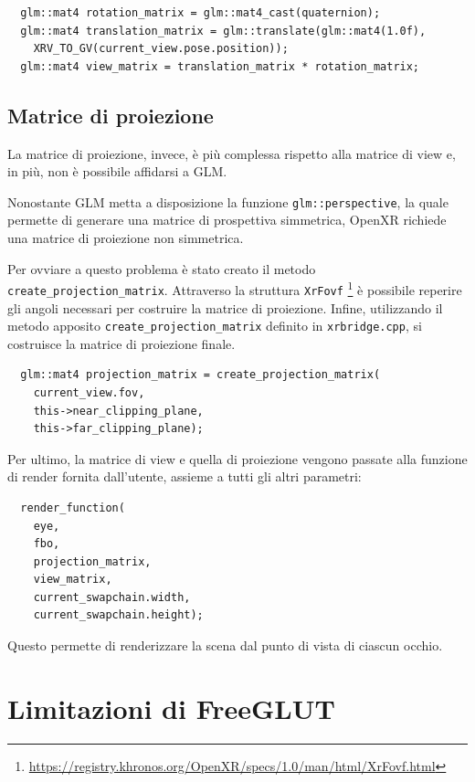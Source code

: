 \documentclass[twoside]{supsistudent}
\begin{document}
\begin{verbatim}
  glm::mat4 rotation_matrix = glm::mat4_cast(quaternion);
  glm::mat4 translation_matrix = glm::translate(glm::mat4(1.0f),
    XRV_TO_GV(current_view.pose.position));
  glm::mat4 view_matrix = translation_matrix * rotation_matrix;
\end{verbatim}

\subsection{Matrice di proiezione}

La matrice di proiezione, invece, è più complessa rispetto alla matrice di view e, in più, non è possibile affidarsi a GLM.

Nonostante GLM metta a disposizione la funzione \texttt{glm::perspective}, la quale permette di generare una matrice di prospettiva simmetrica, OpenXR richiede una matrice di proiezione non simmetrica.

Per ovviare a questo problema è stato creato il metodo \texttt{create\_projection\_matrix}. Attraverso la struttura \texttt{XrFovf} \footnote{\url{https://registry.khronos.org/OpenXR/specs/1.0/man/html/XrFovf.html}} è possibile reperire gli angoli necessari per costruire la matrice di proiezione. Infine, utilizzando il metodo apposito \texttt{create\_projection\_matrix} definito in \texttt{xrbridge.cpp}, si costruisce la matrice di proiezione finale.

\begin{verbatim}
  glm::mat4 projection_matrix = create_projection_matrix(
    current_view.fov,
    this->near_clipping_plane,
    this->far_clipping_plane);
\end{verbatim}

Per ultimo, la matrice di view e quella di proiezione vengono passate alla funzione di render fornita dall'utente, assieme a tutti gli altri parametri:

\begin{verbatim}
  render_function(
    eye,
    fbo,
    projection_matrix,
    view_matrix,
    current_swapchain.width,
    current_swapchain.height);
\end{verbatim}

Questo permette di renderizzare la scena dal punto di vista di ciascun occhio.

\section{Limitazioni di FreeGLUT}
\end{document}
